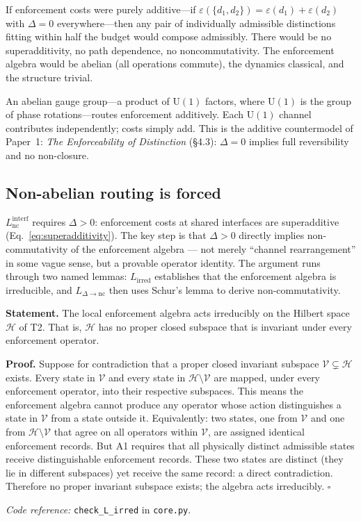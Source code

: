 \documentclass[11pt]{article}
\newcommand{\coderef}[2]{\smallskip\noindent\textit{Code reference:} \texttt{#1} in \texttt{#2}.}
\newcommand{\U}{\mathrm{U}}
\begin{document}
If enforcement costs were purely additive---if $\varepsilon(\{d_1, d_2\}) = \varepsilon(d_1) + \varepsilon(d_2)$ with $\Delta = 0$ everywhere---then any pair of individually admissible distinctions fitting within half the budget would compose admissibly.  There would be no superadditivity, no path dependence, no noncommutativity.  The enforcement algebra would be abelian (all operations commute), the dynamics classical, and the structure trivial.

An abelian gauge group---a product of $\U(1)$ factors, where $\U(1)$ is the group of phase rotations---routes enforcement additively.  Each $\U(1)$ channel contributes independently; costs simply add.  This is the additive countermodel of Paper~1: \emph{The Enforceability of Distinction} (\S4.3): $\Delta = 0$ implies full reversibility and no non-closure.

\subsection{Non-abelian routing is forced}

$L_{\mathrm{nc}}^{\mathrm{interf}}$ requires $\Delta > 0$: enforcement costs at shared interfaces are superadditive (Eq.~\ref{eq:superadditivity}).  The key step is that $\Delta > 0$ directly implies non-commutativity of the enforcement algebra --- not merely ``channel rearrangement'' in some vague sense, but a provable operator identity.  The argument runs through two named lemmas: $L_{\mathrm{irred}}$ establishes that the enforcement algebra is irreducible, and $L_{\Delta\to\mathrm{nc}}$ then uses Schur's lemma to derive non-commutativity.

\begin{tcolorbox}[apfbox, title={Lemma $L_{\mathrm{irred}}$ (Irreducibility from A1)}]
\textbf{Statement.}  The local enforcement algebra acts irreducibly on the Hilbert space $\mathcal{H}$ of T2.  That is, $\mathcal{H}$ has no proper closed subspace that is invariant under every enforcement operator.

\smallskip\noindent\textbf{Proof.}  Suppose for contradiction that a proper closed invariant subspace $\mathcal{V} \subsetneq \mathcal{H}$ exists.  Every state in $\mathcal{V}$ and every state in $\mathcal{H} \setminus \mathcal{V}$ are mapped, under every enforcement operator, into their respective subspaces.  This means the enforcement algebra cannot produce any operator whose action distinguishes a state in $\mathcal{V}$ from a state outside it.  Equivalently: two states, one from $\mathcal{V}$ and one from $\mathcal{H} \setminus \mathcal{V}$ that agree on all operators within $\mathcal{V}$, are assigned identical enforcement records.  But A1 requires that all physically distinct admissible states receive distinguishable enforcement records.  These two states are distinct (they lie in different subspaces) yet receive the same record: a direct contradiction.  Therefore no proper invariant subspace exists; the algebra acts irreducibly.  $\square$

\coderef{check\_L\_irred}{core.py}
\end{tcolorbox}
\end{document}
